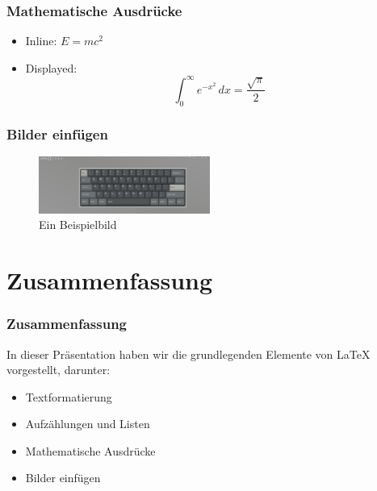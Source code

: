 \documentclass{beamer}
\begin{document}
\begin{frame}
    \frametitle{Mathematische Ausdrücke}
    \begin{itemize}
        \item Inline: \(E = mc^2\)
        \item Displayed:
              \[
                  \int_0^\infty e^{-x^2} \, dx = \frac{\sqrt{\pi}}{2}
              \]
    \end{itemize}
\end{frame}

\begin{frame}
    \frametitle{Bilder einfügen}
    \begin{figure}
        \centering
        \includegraphics[width=0.5\textwidth]{sample}
        \caption{Ein Beispielbild}
    \end{figure}
\end{frame}

\section{Zusammenfassung}

\begin{frame}
    \frametitle{Zusammenfassung}
    In dieser Präsentation haben wir die grundlegenden Elemente von LaTeX vorgestellt, darunter:
    \begin{itemize}
        \item Textformatierung
        \item Aufzählungen und Listen
        \item Mathematische Ausdrücke
        \item Bilder einfügen
    \end{itemize}
\end{frame}
\end{document}
